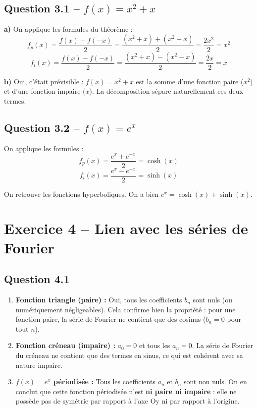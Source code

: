 \documentclass[12pt,a4paper]{article}
\begin{document}
\subsection*{Question 3.1 -- $f(x) = x^2 + x$}

\begin{repbox}
\textbf{a)} On applique les formules du théorème :
\[
    f_p(x) = \frac{f(x)+f(-x)}{2} = \frac{(x^2+x)+(x^2-x)}{2} = \frac{2x^2}{2} = \boxed{x^2}
\]
\[
    f_i(x) = \frac{f(x)-f(-x)}{2} = \frac{(x^2+x)-(x^2-x)}{2} = \frac{2x}{2} = \boxed{x}
\]

\textbf{b)} Oui, c'était prévisible : $f(x) = x^2 + x$ est la somme d'une fonction paire ($x^2$) et d'une fonction impaire ($x$). La décomposition sépare naturellement ces deux termes.
\end{repbox}

\subsection*{Question 3.2 -- $f(x) = e^x$}

\begin{repbox}
On applique les formules :
\[
    f_p(x) = \frac{e^x + e^{-x}}{2} = \boxed{\cosh(x)}
\]
\[
    f_i(x) = \frac{e^x - e^{-x}}{2} = \boxed{\sinh(x)}
\]

On retrouve les fonctions hyperboliques. On a bien $e^x = \cosh(x) + \sinh(x)$.
\end{repbox}

\section*{Exercice 4 -- Lien avec les séries de Fourier}

\subsection*{Question 4.1}

\begin{repbox}
\begin{enumerate}[label=\alph*)]
    \item \textbf{Fonction triangle (paire) :} Oui, tous les coefficients $b_n$ sont nuls (ou numériquement négligeables). Cela confirme bien la propriété : pour une fonction paire, la série de Fourier ne contient que des cosinus ($b_n = 0$ pour tout $n$).

    \item \textbf{Fonction créneau (impaire) :} $a_0 = 0$ et tous les $a_n = 0$. La série de Fourier du créneau ne contient que des termes en sinus, ce qui est cohérent avec sa nature impaire.

    \item \textbf{$f(x) = e^x$ périodisée :} Tous les coefficients $a_n$ et $b_n$ sont non nuls. On en conclut que cette fonction périodisée n'est \textbf{ni paire ni impaire} : elle ne possède pas de symétrie par rapport à l'axe Oy ni par rapport à l'origine.
\end{enumerate}
\end{repbox}
\end{document}
